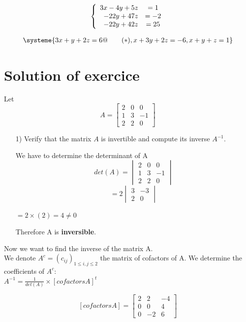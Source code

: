 \documentclass[12pt,a4paper]{article}
\begin{document}
	 \[
	\left\{
	\begin{array}{r c l}
	3x - 4y + 5z &= 1\\
	-22y + 47z &= -2\\
	-22y + 42z &= 25
	\end{array}
	\right.
	\]

   
   
   	\begin{gather*}  	
   	\systeme{3x+y+2z=6@\qquad(*), x+3y+2z=-6, x+y+z=1}    %
   	\end{gather*}
   





\section{Solution of exercice }
Let 
\[
A = 
\begin{bmatrix}
2 & 0 & 0 \\
1 & 3 & -1  \\
2 & 2 & 0
\end{bmatrix}
\]

\begin{enumerate}
	\item[1)] Verify that the matrix $A$ is invertible and compute its inverse $A^{-1}$.
	
	We have to determine the determinant of A 
	\[
	det(A)= \begin{vmatrix}
	2 & 0 & 0 \\
	1 & 3 & -1  \\
	2 & 2 & 0 
	\end{vmatrix} 
	\]
	\qquad 
	\[
	= 2\begin{vmatrix}
	3 & -3  \\
	2 & 0 
	\end{vmatrix} 		
	\] 
	\begin{center}
		$ = 2\times (2) = 4 \neq 0$
	\end{center}
	
	Therefore A is \textbf{inversible}. 
\end{enumerate}	
Now we want to find the inverse of the matrix A.
\\We denote $ A^{c}=(c_{ij})_{1\leq i,j\leq 2} $ the matrix of cofactors of A.
We determine the coefficients of $  A^{c} $:\\
$A^{-1} = \frac{1}{det(A)}\times[cofactorsA]^t$

\[
[cofactors A] =
\begin{bmatrix}
2 & 2 & -4  \\
0 & 0 & 4   \\
0 & -2 & 6
\end{bmatrix}
\]
\end{document}
